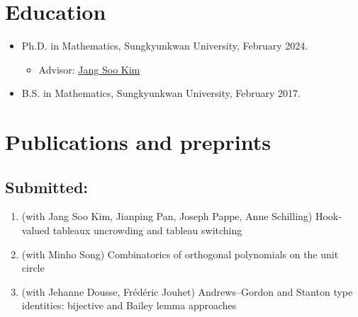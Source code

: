 \documentclass[letterpaper]{article}
\begin{document}
\section*{Education}

\begin{itemize}
  \item Ph.D. in Mathematics, Sungkyunkwan University, February 2024.
    \begin{itemize}
    \item Advisor: \href{https://jangsookim.github.io/}{Jang Soo Kim}
    \end{itemize}

  \item B.S. in Mathematics, Sungkyunkwan University, February 2017.
\end{itemize}









\section*{Publications and preprints}


\subsection*{Submitted:}
\begin{enumerate}
\item (with Jang Soo Kim, Jianping Pan, Joseph Pappe, Anne Schilling) Hook-valued tableaux uncrowding and tableau switching
\item (with Minho Song) Combinatorics of orthogonal polynomials on the unit circle
\item (with Jehanne Dousse, Fr\'ed\'eric Jouhet) Andrews--Gordon and Stanton type identities: bijective and Bailey lemma approaches 
\end{enumerate}
\end{document}
